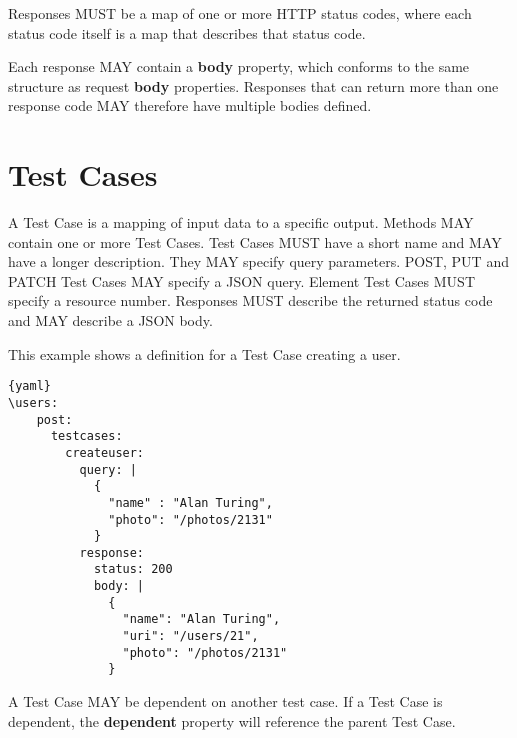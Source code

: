 Responses MUST be a map of one or more HTTP status codes, where each status code itself is a map that describes that status code.

Each response MAY contain a \textbf{body} property, which conforms to the same structure as request \textbf{body} properties. Responses that can return more than one response code MAY therefore have multiple bodies defined.

\section{Test Cases}

A Test Case is a mapping of input data to a specific output. Methods MAY contain one or more Test Cases. Test Cases MUST have a short name and MAY have a longer description. They MAY specify query parameters. POST, PUT and PATCH Test Cases MAY specify a JSON query. Element Test Cases MUST specify a resource number. Responses MUST describe the returned status code and MAY describe a JSON body.

This example shows a definition for a Test Case creating a user.

\begin{lstlisting}{yaml}
\users:
    post:
      testcases:
        createuser:
          query: |
            {
              "name" : "Alan Turing",
              "photo": "/photos/2131"
            }
          response: 
            status: 200
            body: |
              {
                "name": "Alan Turing",
                "uri": "/users/21",
                "photo": "/photos/2131"
              }
\end{lstlisting}

A Test Case MAY be dependent on another test case. If a Test Case is dependent, the \textbf{dependent} property will reference the parent Test Case.